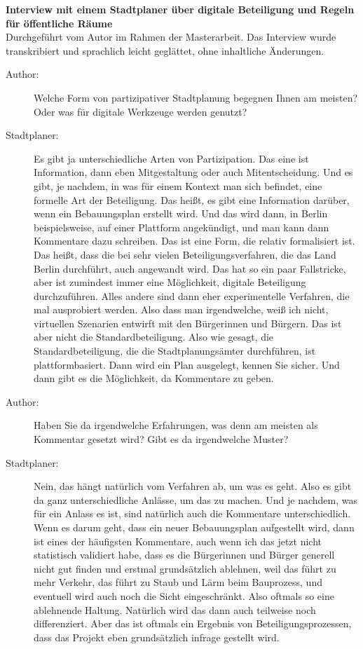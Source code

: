 \begin{flushleft}
\textbf{Interview mit einem Stadtplaner über digitale Beteiligung und Regeln für öffentliche Räume} \\
Durchgeführt vom Autor im Rahmen der Masterarbeit. Das Interview wurde transkribiert und sprachlich leicht geglättet, ohne inhaltliche Änderungen.
\end{flushleft}

\begin{description}
\item[Author:] Welche Form von partizipativer Stadtplanung begegnen Ihnen am meisten? Oder was für digitale Werkzeuge werden genutzt?
\item[Stadtplaner:] Es gibt ja unterschiedliche Arten von Partizipation. Das eine ist Information, dann eben Mitgestaltung oder auch Mitentscheidung. Und es gibt, je nachdem, in was für einem Kontext man sich befindet, eine formelle Art der Beteiligung. Das heißt, es gibt eine Information darüber, wenn ein Bebauungsplan erstellt wird. Und das wird dann, in Berlin beispielsweise, auf einer Plattform angekündigt, und man kann dann Kommentare dazu schreiben. Das ist eine Form, die relativ formalisiert ist. Das heißt, dass die bei sehr vielen Beteiligungsverfahren, die das Land Berlin durchführt, auch angewandt wird. Das hat so ein paar Fallstricke, aber ist zumindest immer eine Möglichkeit, digitale Beteiligung durchzuführen. Alles andere sind dann eher experimentelle Verfahren, die mal ausprobiert werden. Also dass man irgendwelche, weiß ich nicht, virtuellen Szenarien entwirft mit den Bürgerinnen und Bürgern. Das ist aber nicht die Standardbeteiligung. Also wie gesagt, die Standardbeteiligung, die die Stadtplanungsämter durchführen, ist plattformbasiert. Dann wird ein Plan ausgelegt, kennen Sie sicher. Und dann gibt es die Möglichkeit, da Kommentare zu geben.
\item[Author:] Haben Sie da irgendwelche Erfahrungen, was denn am meisten als Kommentar gesetzt wird? Gibt es da irgendwelche Muster?
\item[Stadtplaner:] Nein, das hängt natürlich vom Verfahren ab, um was es geht. Also es gibt da ganz unterschiedliche Anlässe, um das zu machen. Und je nachdem, was für ein Anlass es ist, sind natürlich auch die Kommentare unterschiedlich. Wenn es darum geht, dass ein neuer Bebauungsplan aufgestellt wird, dann ist eines der häufigsten Kommentare, auch wenn ich das jetzt nicht statistisch validiert habe, dass es die Bürgerinnen und Bürger generell nicht gut finden und erstmal grundsätzlich ablehnen, weil das führt zu mehr Verkehr, das führt zu Staub und Lärm beim Bauprozess, und eventuell wird auch noch die Sicht eingeschränkt. Also oftmals so eine ablehnende Haltung. Natürlich wird das dann auch teilweise noch differenziert. Aber das ist oftmals ein Ergebnis von Beteiligungsprozessen, dass das Projekt eben grundsätzlich infrage gestellt wird.

\end{description}
